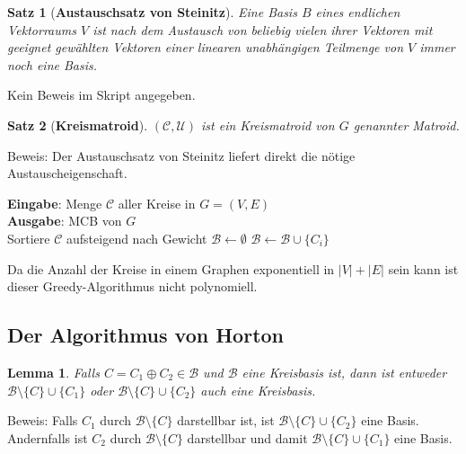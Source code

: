 \documentclass[a4paper,10pt]{scrartcl}
\newcommand{\tbf}{\textbf}
\newcommand{\tsc}{\textsc}
\newcommand{\agn}{\leftarrow}
\newcommand{\Gr}{$G = (V,E)$ }
\newcommand{\calB}{\mathcal{B}}
\newcommand{\calC}{\mathcal{C}}
\newcommand{\calU}{\mathcal{U}}
\newcommand{\Eingabe}[1]{\STATE \tbf{Eingabe}: #1 \\}
\newcommand{\Ausgabe}[1]{\STATE \tbf{Ausgabe}: #1 \\}
\newtheorem{satz}{Satz}
\newtheorem{lemma}{Lemma}
\begin{document}
\begin{satz}[\tbf{Austauschsatz von Steinitz}]
 Eine Basis $B$ eines endlichen Vektorraums $V$ ist nach dem Austausch von beliebig vielen ihrer Vektoren mit geeignet gewählten Vektoren einer linearen unabhängigen Teilmenge von $V$ immer noch eine Basis.
\end{satz}

Kein Beweis im Skript angegeben. \\

\begin{satz}[\tbf{Kreismatroid}]
 $(\calC,\calU)$ ist ein Kreismatroid von $G$ genannter Matroid.
\end{satz}

Beweis: Der Austauschsatz von Steinitz liefert direkt die nötige Austauscheigenschaft. \\

\begin{algorithm}
\caption{$\tsc{MCB-Greedy-Algorithmus}(\calC)$}
\begin{algorithmic}
\Eingabe{Menge $\calC$ aller Kreise in \Gr}
\Ausgabe{MCB von $G$}
\STATE Sortiere $\calC$ aufsteigend nach Gewicht
\STATE $\calB \agn \emptyset$
	\IF{$\calB \cup \{C_i\}$ linear unabhängig}
		\STATE $\calB \agn \calB \cup \{C_i\}$
	\ENDIF
\ENDFOR
\end{algorithmic}
\end{algorithm}

Da die Anzahl der Kreise in einem Graphen exponentiell in $|V| + |E|$ sein kann ist dieser Greedy-Algorithmus nicht polynomiell. \\

\subsection{Der Algorithmus von \textsf{Horton}}
\begin{lemma}\label{Kreisbasiszerlegung}
 Falls $C = C_1 \oplus C_2 \in \calB$ und $\calB$ eine Kreisbasis ist, dann ist entweder $\calB \setminus \{C\} \cup \{C_1\}$ oder $\calB \setminus \{C\} \cup \{C_2\}$ auch eine Kreisbasis.
\end{lemma}

Beweis: Falls $C_1$ durch $\calB \setminus \{C\}$ darstellbar ist, ist $\calB \setminus \{C\} \cup \{C_2\}$ eine Basis. Andernfalls ist $C_2$ durch $\calB \setminus \{C\}$ darstellbar und damit $\calB \setminus \{C\} \cup \{C_1\}$ eine Basis. \\
\end{document}
